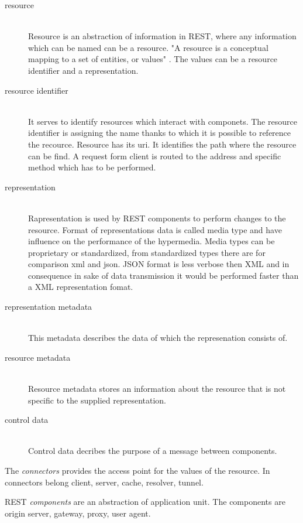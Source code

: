 \begin{description}
  \item [resource] \hfill \\ 
  Resource is an abstraction of information in REST, where any information which can be named can be a resource. "A resource is a conceptual mapping to a set of entities, or values" \cite{fielding}. The values can be a resource identifier and a representation.
  \item [resource identifier] \hfill \\
  It serves to identify resources which interact with componets. The resource identifier is assigning the name thanks to which it is possible to reference the recource. Resource has its \gls{uri}. It identifies the path where the resource can be find. A request form client is routed to the address and specific method which has to be performed.
  \item [representation] \hfill \\
  Rapresentation is used by REST components to perform changes to the resource. Format of representations data is called media type and have influence on the performance of the hypermedia. Media types can be proprietary or standardized, from standardized types there are for comparison \gls{xml} and \gls{json}. JSON format is less verbose then XML and in consequence in sake of data transmission it would be performed faster than a XML representation fomat.
  \item [representation metadata] \hfill \\
  This metadata describes the data of which the represenation consists of.
   \item [resource metadata] \hfill \\
  Resource metadata stores an information about the resource that is not specific to the supplied representation.
  \item [control data] \hfill \\
  Control data decribes the purpose of a message between components. %
\end{description}

The \emph{connectors} provides the access point for the values of the resource. In connectors belong client, server, cache, resolver, tunnel. 

REST \emph{components} are an abstraction of application unit. The components are origin server, gateway, proxy, user agent.

